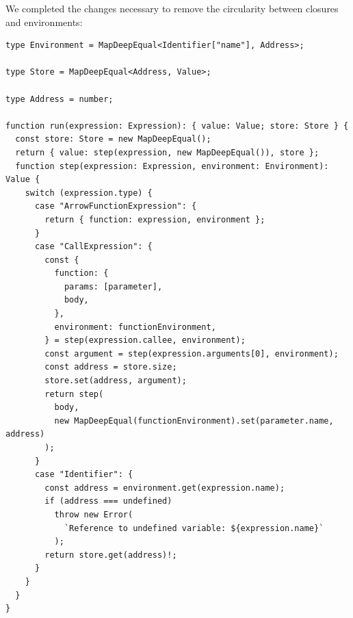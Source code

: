 \documentclass[12pt, oneside]{book}
\begin{document}
We completed the changes necessary to remove the circularity between closures and environments:

\begin{verbatim}
type Environment = MapDeepEqual<Identifier["name"], Address>;

type Store = MapDeepEqual<Address, Value>;

type Address = number;

function run(expression: Expression): { value: Value; store: Store } {
  const store: Store = new MapDeepEqual();
  return { value: step(expression, new MapDeepEqual()), store };
  function step(expression: Expression, environment: Environment): Value {
    switch (expression.type) {
      case "ArrowFunctionExpression": {
        return { function: expression, environment };
      }
      case "CallExpression": {
        const {
          function: {
            params: [parameter],
            body,
          },
          environment: functionEnvironment,
        } = step(expression.callee, environment);
        const argument = step(expression.arguments[0], environment);
        const address = store.size;
        store.set(address, argument);
        return step(
          body,
          new MapDeepEqual(functionEnvironment).set(parameter.name, address)
        );
      }
      case "Identifier": {
        const address = environment.get(expression.name);
        if (address === undefined)
          throw new Error(
            `Reference to undefined variable: ${expression.name}`
          );
        return store.get(address)!;
      }
    }
  }
}
\end{verbatim}
\end{document}
